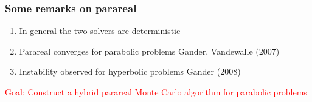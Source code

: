 \documentclass[aspectratio=169]{beamer}
\begin{document}
%
\begin{frame}
  \frametitle{Some remarks on parareal}
  \begin{enumerate}
  \item
    In general the two solvers are deterministic
    \vspace{0.2 cm}
  \item
    Parareal converges for parabolic problems \textcolor{burntorange}{\footnotesize{Gander, Vandewalle (2007)}}
    \vspace{0.2 cm}
  \item
    Instability observed for hyperbolic problems \textcolor{burntorange}{\footnotesize{Gander (2008)}} 
  \end{enumerate}
  \vspace*{0.2 cm}
  \textcolor{red}{Goal: Construct a hybrid parareal Monte Carlo algorithm for parabolic problems}
  \end{frame}
\end{document}

